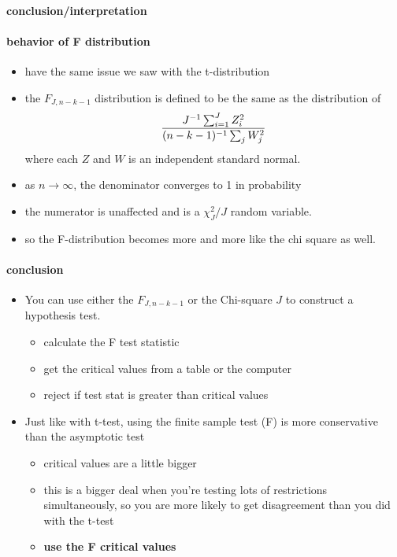 \paragraph{conclusion/interpretation}

\paragraph{behavior of F distribution}

\begin{itemize}
\item have the same issue we saw with the t-distribution
\item the $F_{J, n-k-1}$ distribution is defined to be the same as
          the distribution of
          \[{J^{-1} \sum_{i=1}^J Z_i^2 \over (n-k-1)^{-1} \sum_j
          W_j^2}\] where each $Z$ and $W$ is an independent standard normal.
\item as $n\to \infty$, the denominator converges to 1 in probability
\item the numerator is unaffected and is a $\chi^2_J / J$ random variable.
\item so the F-distribution becomes more and more like the chi
          square as well.
\end{itemize}

\paragraph{conclusion}
\begin{itemize}
\item You can use either the $F_{J, n-k-1}$ or the Chi-square $J$ to
          construct a hypothesis test.
\begin{itemize}
\item calculate the F test statistic
\item get the critical values from a table or the computer
\item reject if test stat is greater than critical values
\end{itemize}
\item Just like with t-test, using the finite sample test (F) is
          more conservative than the asymptotic test
\begin{itemize}
\item critical values are a little bigger
\item this is a bigger deal when you're testing lots of
            restrictions simultaneously, so you are more likely to get
            disagreement than you did with the t-test
\item \textbf{use the F critical values}
\end{itemize}
\end{itemize}

